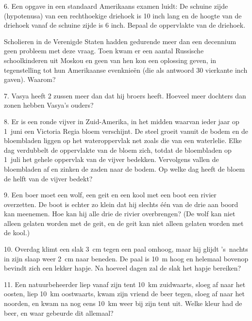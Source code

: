 \begin{problem}{6.}
	Een opgave in een standaard Amerikaans examen luidt: De schui\-ne zijde (hypotenusa) van een rechthoekige driehoek is 10 inch lang en de hoogte van de driehoek vanaf de schuine zijde is 6 inch. Bepaal de oppervlakte van de driehoek.

	Scholieren in de Verenigde Staten hadden gedurende meer dan een decennium geen probleem met deze vraag. Toen kwam er een aantal Russische schoolkinderen uit Moskou en geen van hen kon een oplossing geven, in tegenstelling tot hun Amerikaanse evenknieën (die als antwoord 30 vierkante inch gaven). Waarom?
\end{problem}

\begin{problem}{7.}
	Vasya heeft 2 zussen meer dan dat hij broers heeft. Hoeveel meer dochters dan zonen hebben Vasya's ouders?
\end{problem}

\clearpage

\begin{problem}{8.}
	Er is een ronde vijver in Zuid-Amerika, in het midden waarvan ieder jaar op 1~juni een Victoria Regia bloem verschijnt. De steel groeit vanuit de bodem en de bloembladen liggen op het wateroppervlak net zoals die van een waterlelie. Elke dag verdubbelt de oppervlakte van de bloem zich, totdat de bloembladen op 1~juli het gehele oppervlak van de vijver bedekken. Vervolgens vallen de bloembladen af en zinken de zaden naar de bodem. Op welke dag heeft de bloem de helft van de vijver bedekt?
\end{problem}

\begin{problem}{9.}
	Een boer moet een wolf, een geit en een kool met een boot een rivier overzetten. De boot is echter zo klein dat hij slechts één van de drie aan boord kan meenemen. Hoe kan hij alle drie de rivier overbrengen? (De wolf kan niet alleen gelaten worden met de geit, en de geit kan niet alleen gelaten worden met de kool.)
\end{problem}

\begin{problem}{10.}
	Overdag klimt een slak \SI{3}{\cm} tegen een paal omhoog, maar hij glijdt 's~nachts in zijn slaap weer \SI{2}{\cm} naar beneden. De paal is \SI{10}{\metre} hoog en helemaal bovenop bevindt zich een lekker hapje. Na hoeveel dagen zal de slak het hapje bereiken?
\end{problem}

\begin{problem}{11.}
	Een natuurbeheerder liep vanaf zijn tent \SI{10}{\km} zuidwaarts, sloeg af naar het oosten, liep \SI{10}{\km} oostwaarts, kwam zijn vriend de beer tegen, sloeg af naar het noorden, en kwam na nog eens \SI{10}{\km} weer bij zijn tent uit. Welke kleur had de beer, en waar gebeurde dit allemaal?
\end{problem}

